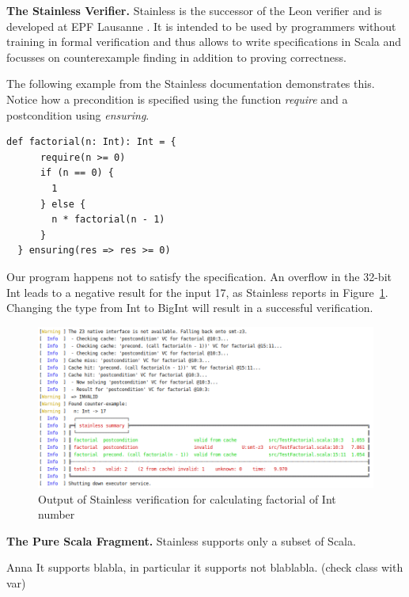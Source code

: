 \documentclass[runningheads]{llncs}
\renewcommand{\paragraph}{\textbf}%
\newcommand{\todo}[1]{{\par \color{red}#1}}
\begin{document}
\paragraph{The Stainless Verifier.} Stainless is the successor of the
Leon verifier
\cite{DBLP:conf/ecoop/BlancKKS13,DBLP:conf/pldi/VoirolKK15,DBLP:conf/pldi/BlancK15}
and is developed at EPF Lausanne
\cite{Stainless:github}. It is intended to be
used by programmers without training in formal verification and thus
allows to write specifications in Scala and focusses on counterexample
finding in addition to proving correctness.

The following example from the Stainless documentation
\cite{Stainless:documentation} demonstrates this. Notice how a
precondition is specified using the function \emph{require} and a
postcondition using \emph{ensuring}.

\begin{lstlisting}[style=scala]
  def factorial(n: Int): Int = {
      require(n >= 0)
      if (n == 0) {
        1
      } else {
        n * factorial(n - 1)
      }
  } ensuring(res => res >= 0)
\end{lstlisting}

Our program happens not to satisfy the specification. An overflow in
the 32-bit Int leads to a negative result for the input 17, as
Stainless reports in Figure~\ref{fig:failed}. Changing the type from
Int to BigInt will result in a successful verification.

\begin{figure}
	\centering
		\includegraphics[width=\textwidth]{output1.png}
	\caption{Output of Stainless verification for calculating factorial of Int number}
	\label{fig:failed}
\end{figure}


\paragraph{The Pure Scala Fragment.} Stainless supports only a subset
of Scala. \todo{Anna It supports blabla, in particular it supports not
  blablabla. (check class with var)}
\end{document}
